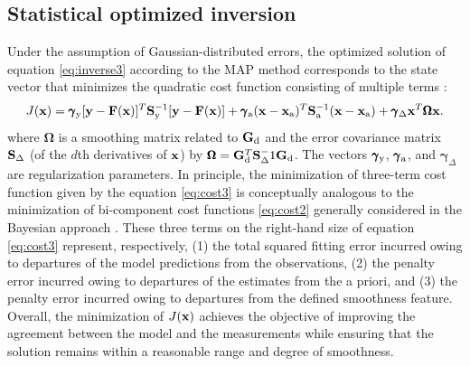 \subsection{Statistical optimized inversion}
\label{subsec:alg-inv}

Under the assumption of Gaussian-distributed errors, the optimized
solution of equation \eqref{eq:inverse3} according to the 
MAP method corresponds to the state vector that minimizes the quadratic cost
function consisting of multiple terms \citep{Dubovik00a, Dubovik04}:
\begin{equation}
J(\mathbf{x}) = \pmb{\gamma}_\text{y}[\mathbf{y}-\mathbf{F}(\mathbf{x})]^T\mathbf{S}_\text{y}^{-1}[\mathbf{y}-\mathbf{F}(\mathbf{x})] +
          \pmb{\gamma}_\text{a}(\mathbf{x}-\mathbf{x}_\text{a})^T\mathbf{S}_\text{a}^{-1}(\mathbf{x}-\mathbf{x}_\text{a}) +
          \pmb{\gamma}_\Delta\mathbf{x}^T\pmb{\Omega}\mathbf{x}.
\label{eq:cost3}
\end{equation}
where $\pmb{\Omega}$ is a smoothing matrix related to $\mathbf{G}_\text{d}$ and the 
error covariance matrix $\mathbf{S}_\Delta$ (of the $d$th derivatives of
$\mathbf{x}$) by $\pmb{\Omega}=\mathbf{G}_\text{d}^T\mathbf{S}_\Delta^-1\mathbf{G}_\text{d}$. The
vectors $\pmb{\gamma}_\text{y}$, $\pmb{\gamma}_\text{a}$, and 
$\pmb{\gamma}_\Delta$ are regularization parameters. In principle,
the minimization of three-term cost function given by the equation
\eqref{eq:cost3} is conceptually analogous to the minimization of 
bi-component cost functions \eqref{eq:cost2} generally considered 
in the Bayesian approach \citep{Rodgers00}. These three terms on the 
right-hand size of equation \eqref{eq:cost3} represent,
respectively, (1) the total squared fitting error incurred owing to
departures of the model predictions from the observations, (2) the
penalty error incurred owing to departures of the estimates from the a
priori, and (3) the penalty error incurred owing to departures from the
defined smoothness feature. Overall, the minimization of $J(\mathbf{x})$ achieves
the objective of improving the agreement between the model and the
measurements while ensuring that the solution remains within a
reasonable range and degree of smoothness. 

